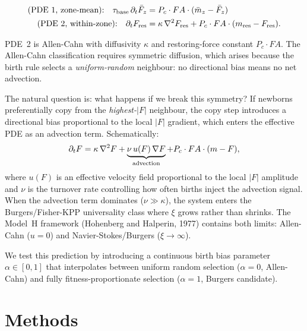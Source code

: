 \documentclass[11pt]{article}
\begin{document}
\begin{align}
  \text{(PDE 1, zone-mean):}\quad
  \tau_{\rm base}\,\partial_t \bar{F}_z &= P_c\cdot FA\cdot(\bar{m}_z - \bar{F}_z) \label{eq:pde1} \\
  \text{(PDE 2, within-zone):}\quad
  \partial_t F_{\rm res} &= \kappa\,\nabla^2 F_{\rm res}
                            + P_c\cdot FA\cdot(m_{\rm res} - F_{\rm res}). \label{eq:pde2}
\end{align}

PDE~2 is Allen-Cahn with diffusivity $\kappa$ and restoring-force constant
$P_c \cdot FA$.
The Allen-Cahn classification requires symmetric diffusion, which arises
because the birth rule selects a \emph{uniform-random} neighbour: no
directional bias means no net advection.

The natural question is: what happens if we break this symmetry?
If newborns preferentially copy from the \emph{highest-$|F|$} neighbour,
the copy step introduces a directional bias proportional to the local
$|F|$ gradient, which enters the effective PDE as an advection term.
Schematically:
\begin{equation}
  \partial_t F = \kappa\,\nabla^2 F + \underbrace{\nu\,u(F)\,\nabla F}_{\rm advection}
                 + P_c\cdot FA\cdot(m - F),
  \label{eq:pde_full}
\end{equation}
where $u(F)$ is an effective velocity field proportional to the local
$|F|$ amplitude and $\nu$ is the turnover rate controlling how often
births inject the advection signal.
When the advection term dominates ($\nu \gg \kappa$), the system enters
the Burgers/Fisher-KPP universality class where $\xi$ grows rather than
shrinks.
The Model~H framework (Hohenberg and Halperin, 1977) contains both
limits: Allen-Cahn ($u = 0$) and Navier-Stokes/Burgers ($\xi \to \infty$).

We test this prediction by introducing a continuous birth bias parameter
$\alpha \in [0,1]$ that interpolates between uniform random selection
($\alpha=0$, Allen-Cahn) and fully fitness-proportionate selection
($\alpha=1$, Burgers candidate).

\section{Methods}
\end{document}
